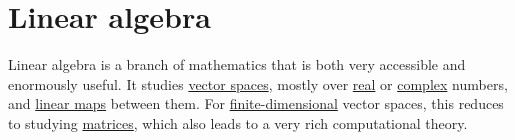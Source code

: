\section{Linear algebra}\label{sec:linear_algebra}

Linear algebra is a branch of mathematics that is both very accessible and enormously useful. It studies \hyperref[def:vector_space]{vector spaces}, mostly over \hyperref[def:set_of_real_numbers]{real} or \hyperref[def:set_of_complex_numbers]{complex} numbers, and \hyperref[def:semimodule/homomorphism]{linear maps} between them. For \hyperref[def:vector_space_dimension]{finite-dimensional} vector spaces, this reduces to studying \hyperref[def:array/matrix]{matrices}, which also leads to a very rich computational theory.
